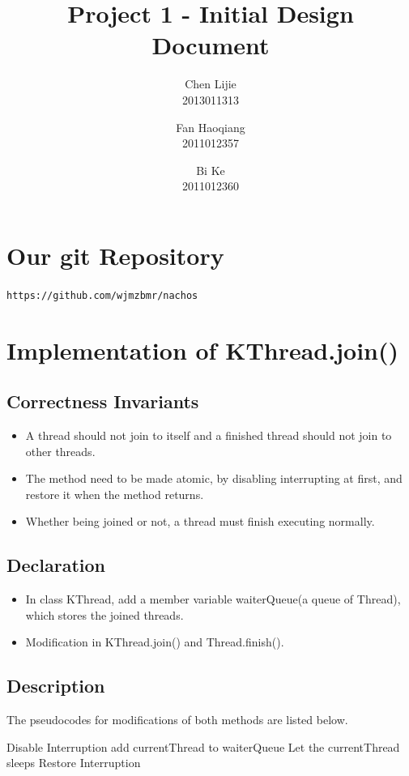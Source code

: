 \documentclass{article}
\title{Project 1 - Initial Design Document}
\author{Chen Lijie\\ 2013011313\and
	Fan Haoqiang\\ 2011012357\and
	Bi Ke\\ 2011012360}
\date{}
\begin{document}
	\maketitle
	\tableofcontents
	\section{Our git Repository}
	\texttt{https://github.com/wjmzbmr/nachos}
	\section{Implementation of KThread.join()}
	
	\subsection{Correctness Invariants}
	
	\begin{itemize}
		\item A thread should not join to itself and a finished thread should not join to other threads.
		\item The method need to be made atomic, by disabling interrupting at first, and restore it when the method returns.
		\item Whether being joined or not, a thread must finish executing normally.
	\end{itemize}

	\subsection{Declaration}
	\begin{itemize}
		\item In class KThread, add a member variable waiterQueue(a queue of Thread), which stores the joined threads.
		
		\item Modification in KThread.join() and Thread.finish().
    \end{itemize}
	
	\subsection{Description}
	
	The pseudocodes for modifications of both methods are listed below.
	
	\begin{algorithm}[H]
		\begin{algorithmic}
   				\State Disable Interruption
					\State add currentThread to waiterQueue
					\State Let the currentThread sleeps
				\EndIf
				\State Restore Interruption
			\EndProcedure
		\end{algorithmic}
	\end{algorithm}
	
\end{document}

